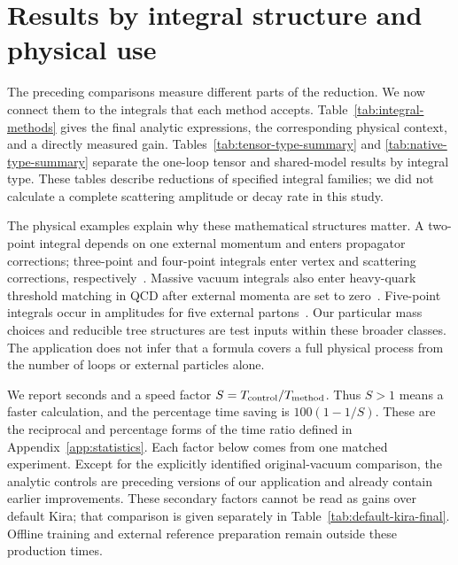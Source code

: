 \section{Results by integral structure and physical use}
\label{sec:integral-results}
The preceding comparisons measure different parts of the reduction. We now connect them to the integrals that each method accepts. Table~\ref{tab:integral-methods} gives the final analytic expressions, the corresponding physical context, and a directly measured gain. Tables~\ref{tab:tensor-type-summary} and \ref{tab:native-type-summary} separate the one-loop tensor and shared-model results by integral type. These tables describe reductions of specified integral families; we did not calculate a complete scattering amplitude or decay rate in this study.

The physical examples explain why these mathematical structures matter. A two-point integral depends on one external momentum and enters propagator corrections; three-point and four-point integrals enter vertex and scattering corrections, respectively~\cite{Weinzierl2022,DennerDittmaier2006}. Massive vacuum integrals also enter heavy-quark threshold matching in QCD after external momenta are set to zero~\cite{SchroderSteinhauser2006}. Five-point integrals occur in amplitudes for five external partons~\cite{Agarwal2024}. Our particular mass choices and reducible tree structures are test inputs within these broader classes. The application does not infer that a formula covers a full physical process from the number of loops or external particles alone.

We report seconds and a speed factor $S=T_{\rm control}/T_{\rm method}$. Thus $S>1$ means a faster calculation, and the percentage time saving is $100(1-1/S)$. These are the reciprocal and percentage forms of the time ratio defined in Appendix~\ref{app:statistics}. Each factor below comes from one matched experiment. Except for the explicitly identified original-vacuum comparison, the analytic controls are preceding versions of our application and already contain earlier improvements. These secondary factors cannot be read as gains over default Kira; that comparison is given separately in Table~\ref{tab:default-kira-final}. Offline training and external reference preparation remain outside these production times.

